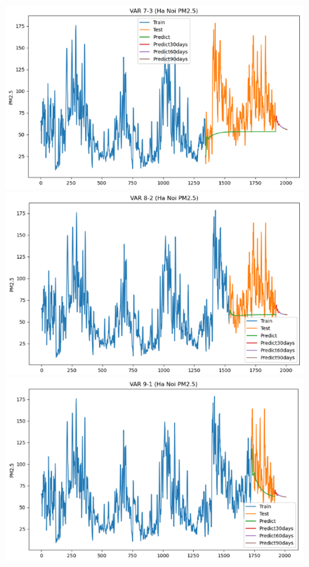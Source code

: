 \begin{figure}[H]
{\begin{adjustbox}{minipage=0.48\textwidth}
\begin{minipage}{0.3\textwidth}
            \end{minipage}\hfill
            \begin{minipage}{0.3\textwidth}
                \centering
                \includegraphics[width=\textwidth]{img/final/VAR/90D/VAR_7_3_HN.png}\\
                \includegraphics[width=\textwidth]{img/final/VAR/90D/VAR_8_2_HN.png}\\
                \includegraphics[width=\textwidth]{img/final/VAR/90D/VAR_9_1_HN.png}

\end{minipage}
\end{adjustbox}}
\end{figure}
